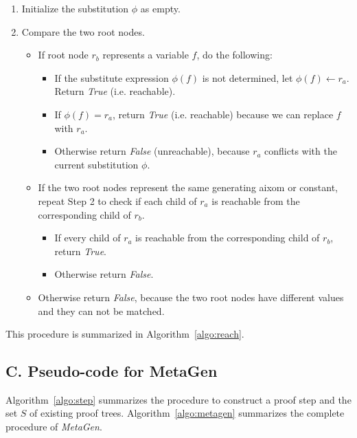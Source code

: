 \documentclass{article}
\begin{document}
\begin{enumerate}
    \item Initialize the substitution $\phi$ as empty.
    \item Compare the two root nodes.
    \begin{itemize}
        \item If root node $r_b$ represents a variable $f$, do the following:
            \begin{itemize}
                \item If the substitute expression $\phi(f)$ is not determined, let $\phi(f) \leftarrow r_a$. Return \emph{True} (i.e. reachable). 
                \item If $\phi(f)=r_a$, return \emph{True} (i.e. reachable) because we can replace $f$ with $r_a$.   
                \item Otherwise return \emph{False} (unreachable), because $r_a$ 
                conflicts with the current substitution $\phi$. 
            \end{itemize}
        \item If the two root nodes represent the same generating aixom or constant, 
            repeat Step 2 to check if each child of $r_a$ is reachable from 
            the corresponding child of $r_b$. 
            \begin{itemize}
                \item If every child of $r_a$ is reachable 
                    from the corresponding child of $r_b$, return \emph{True}.
                \item Otherwise return \emph{False}.
            \end{itemize}
        \item Otherwise return \emph{False}, because the two root nodes have different values and they can not be matched.
    \end{itemize}
\end{enumerate}


This procedure is summarized in Algorithm~\ref{algo:reach}. 


\subsection*{C. Pseudo-code for MetaGen}
\label{app:code}
Algorithm~\ref{algo:step} summarizes the procedure to construct a proof step and the set $S$ of existing proof trees.
Algorithm~\ref{algo:metagen} summarizes the complete procedure of \emph{MetaGen}.
\end{document}

